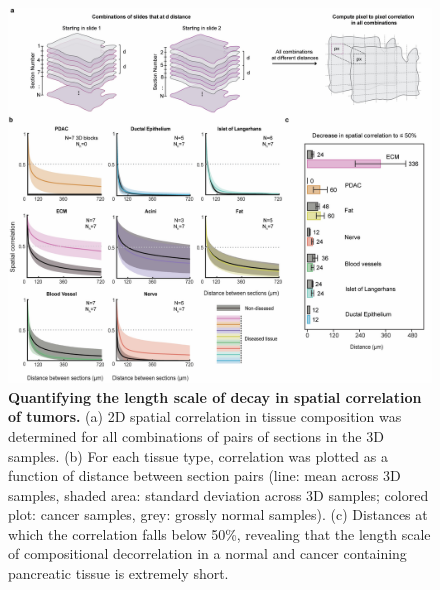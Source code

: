 \begin{refsection}
    \begin{figure}[h!]
        \begin{center}
            \includegraphics[width=\textwidth,clip,page=1] {figures/chapter2/PDAC_Fig_2.jpg}
            \caption{\textbf{Quantifying the length scale of decay in spatial correlation of tumors.} (a) 2D spatial correlation in tissue composition was determined for all combinations of pairs of sections in the 3D samples. (b) For each tissue type, correlation was plotted as a function of distance between section pairs (line: mean across 3D samples, shaded area: standard deviation across 3D samples; colored plot: cancer samples, grey: grossly normal samples). (c) Distances at which the correlation falls below 50\%, revealing that the length scale of compositional decorrelation in a normal and cancer containing pancreatic tissue is extremely short.}
            \label{chapter2_fig2}
        \end{center}
    \end{figure}
    

\end{refsection}
